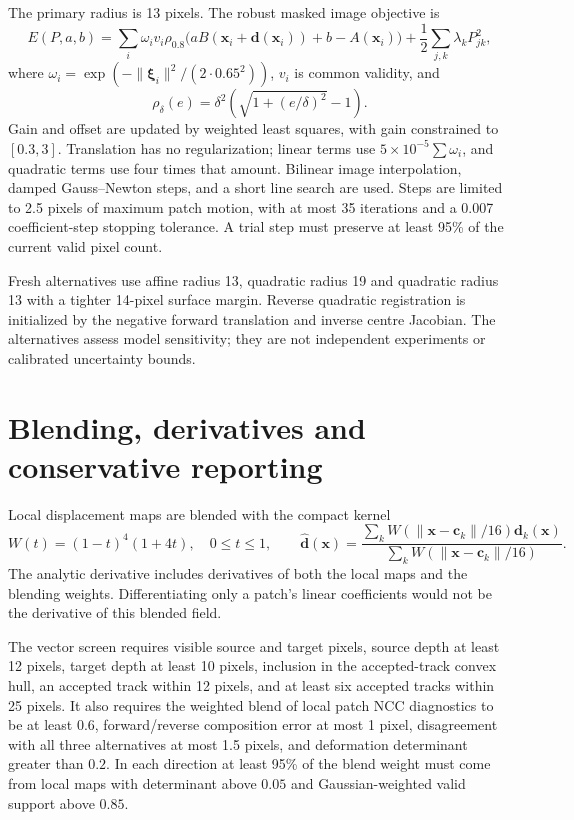 \documentclass[11pt]{article}
\begin{document}
The primary radius is 13 pixels. The robust masked image objective is
\[
 E(P,a,b)=\sum_i \omega_i v_i\rho_{0.8}
 \bigl(aB(\mathbf x_i+\mathbf d(\mathbf x_i))+b-A(\mathbf x_i)\bigr)
 +\frac12\sum_{j,k}\lambda_k P_{jk}^2,
\]
where $\omega_i=\exp(-\|\boldsymbol\xi_i\|^2/(2\cdot0.65^2))$, $v_i$ is common validity, and
\[
 \rho_\delta(e)=\delta^2\left(\sqrt{1+(e/\delta)^2}-1\right).
\]
Gain and offset are updated by weighted least squares, with gain constrained to $[0.3,3]$. Translation has no regularization; linear terms use $5\times10^{-5}\sum\omega_i$, and quadratic terms use four times that amount. Bilinear image interpolation, damped Gauss--Newton steps, and a short line search are used. Steps are limited to 2.5 pixels of maximum patch motion, with at most 35 iterations and a 0.007 coefficient-step stopping tolerance. A trial step must preserve at least 95\% of the current valid pixel count.

Fresh alternatives use affine radius 13, quadratic radius 19 and quadratic radius 13 with a tighter 14-pixel surface margin. Reverse quadratic registration is initialized by the negative forward translation and inverse centre Jacobian. The alternatives assess model sensitivity; they are not independent experiments or calibrated uncertainty bounds.

\section{Blending, derivatives and conservative reporting}
Local displacement maps are blended with the compact kernel
\[
 W(t)=(1-t)^4(1+4t),\quad 0\le t\le1,\qquad
 \widehat{\mathbf d}(\mathbf x)=
 \frac{\sum_k W(\|\mathbf x-\mathbf c_k\|/16)\mathbf d_k(\mathbf x)}
 {\sum_k W(\|\mathbf x-\mathbf c_k\|/16)}.
\]
The analytic derivative includes derivatives of both the local maps and the blending weights. Differentiating only a patch's linear coefficients would not be the derivative of this blended field.

The vector screen requires visible source and target pixels, source depth at least 12 pixels, target depth at least 10 pixels, inclusion in the accepted-track convex hull, an accepted track within 12 pixels, and at least six accepted tracks within 25 pixels. It also requires the weighted blend of local patch NCC diagnostics to be at least $0.6$, forward/reverse composition error at most 1 pixel, disagreement with all three alternatives at most 1.5 pixels, and deformation determinant greater than $0.2$. In each direction at least 95\% of the blend weight must come from local maps with determinant above $0.05$ and Gaussian-weighted valid support above $0.85$.
\end{document}
